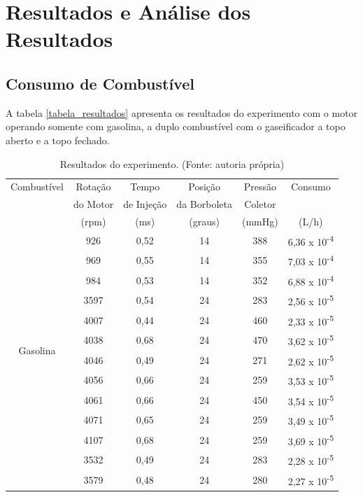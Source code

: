 \chapter[Resultados e Análise dos Resultados]{Resultados e Análise dos Resultados}

\section{Consumo de Combustível}
A tabela \ref{tabela_resultados} apresenta os resultados do experimento com o motor operando somente com gasolina, a duplo combustível com o gaseificador a topo aberto e a topo fechado. 

\begin{table}[h]
	\centering
	\caption{Resultados do experimento. (Fonte: autoria própria)}
	\begin{tabular}{|c|c|c|c|c|c|}
		\hline
		Combustível & Rotação & Tempo & Posição & Pressão & Consumo	\\
		& do Motor & de Injeção & da Borboleta & Coletor & \\
		& (rpm) & (ms) & (graus) & (mmHg) & (L/h)\\
		\hline
		\multirow{12}{4.5cm}{Gasolina}
		& 926 & 0,52 & 14 & 388 & 6,36 x 10\textsuperscript{-4}\\
		& 969 & 0,55 & 14 & 355 & 7,03 x 10\textsuperscript{-4}\\
		& 984 & 0,53 & 14 & 352 & 6,88 x 10\textsuperscript{-4}\\
		& 3597 & 0,54 & 24 & 283 & 2,56 x 10\textsuperscript{-5} \\
		& 4007 & 0,44 & 24 & 460 & 2,33 x 10\textsuperscript{-5}\\
		& 4038 & 0,68 & 24 & 470 & 3,62 x 10\textsuperscript{-5}\\
		& 4046 & 0,49 & 24 & 271 & 2,62 x 10\textsuperscript{-5}\\
		& 4056 & 0,66 & 24 & 259 & 3,53 x 10\textsuperscript{-5}\\
		& 4061 & 0,66 & 24 & 450 & 3,54 x 10\textsuperscript{-5}\\
		& 4071 & 0,65 & 24 & 259 & 3,49 x 10\textsuperscript{-5}\\
		& 4107 & 0,68 & 24 & 259 & 3,69 x 10\textsuperscript{-5}\\
		\hline
		\multirow{12}{4.5cm}{Gasolina + syngas (Topo aberto)}
		& 3532 & 0,49 & 24 & 283 & 2,28 x 10\textsuperscript{-5}\\
		& 3579 & 0,48 & 24 & 280 & 2,27 x 10\textsuperscript{-5}\\

\end{tabular}
\end{table}
